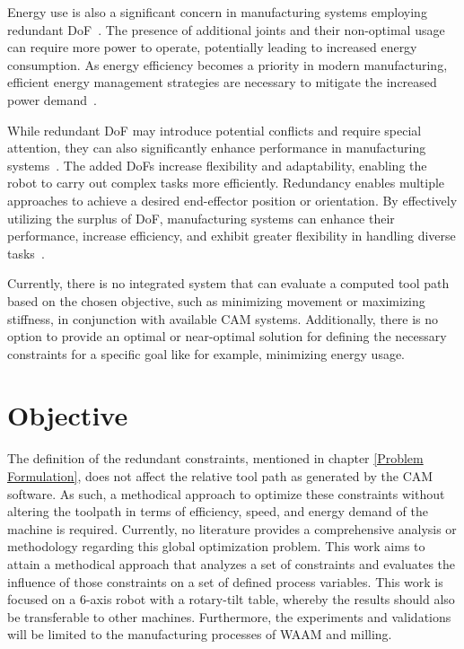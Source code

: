 Energy use is also a significant concern in manufacturing systems employing redundant DoF~\cite{Doan.2016}. The presence of additional joints and their non-optimal usage can require more power to operate, potentially leading to increased energy consumption. As energy efficiency becomes a priority in modern manufacturing, efficient energy management strategies are necessary to mitigate the increased power demand~\cite{Boscariol.2020, Boscariol.2019}. 



While redundant DoF may introduce potential conflicts and require special attention, they can also significantly enhance performance in manufacturing systems~\cite{Ayten.2016}. The added DoFs increase flexibility and adaptability, enabling the robot to carry out complex tasks more efficiently. Redundancy enables multiple approaches to achieve a desired end-effector position or orientation. By effectively utilizing the surplus of DoF, manufacturing systems can enhance their performance, increase efficiency, and exhibit greater flexibility in handling diverse tasks~\cite{Boscariol.2020}. 

Currently, there is no integrated system that can evaluate a computed tool path based on the chosen objective, such as minimizing movement or maximizing stiffness, in conjunction with available CAM systems. Additionally, there is no option to provide an optimal or near-optimal solution for defining the necessary constraints for a specific goal like for example, minimizing energy usage.


\section{Objective}\label{OBJECTIVE}
The definition of the redundant constraints, mentioned in chapter \ref{Problem Formulation}, does not affect the relative tool path as generated by the CAM software. As such, a methodical approach to optimize these constraints without altering the toolpath in terms of efficiency, speed, and energy demand of the machine is required. Currently, no literature provides a comprehensive analysis or methodology regarding this global optimization problem.
This work aims to attain a methodical approach that analyzes a set of constraints and evaluates the influence of those constraints on a set of defined process variables. This work is focused on a 6-axis robot with a rotary-tilt table, whereby the results should also be transferable to other machines. Furthermore, the experiments and validations will be limited to the manufacturing processes of WAAM and milling. 


